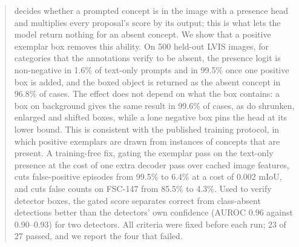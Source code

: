 \begin{abstract}
\sam{} decides whether a prompted concept is in the image with a presence head and multiplies every proposal's score by its output; this is what lets the model return nothing for an absent concept.
We show that a positive exemplar box removes this ability.
On 500 held-out LVIS images, for categories that the annotations verify to be absent, the presence logit is non-negative in 1.6\% of text-only prompts and in 99.5\% once one positive box is added, and the boxed object is returned as the absent concept in 96.8\% of cases.
The effect does not depend on what the box contains: a box on background gives the same result in 99.6\% of cases, as do shrunken, enlarged and shifted boxes, while a lone negative box pins the head at its lower bound.
This is consistent with the published training protocol, in which positive exemplars are drawn from instances of concepts that are present.
A training-free fix, gating the exemplar pass on the text-only presence at the cost of one extra decoder pass over cached image features, cuts false-positive episodes from 99.5\% to 6.4\% at a cost of 0.002 mIoU, and cuts false counts on FSC-147 from 85.5\% to 4.3\%.
Used to verify detector boxes, the gated score separates correct from class-absent detections better than the detectors' own confidence (AUROC 0.96 against 0.90--0.93) for two detectors.
All criteria were fixed before each run; 23 of 27 passed, and we report the four that failed.
\end{abstract}
